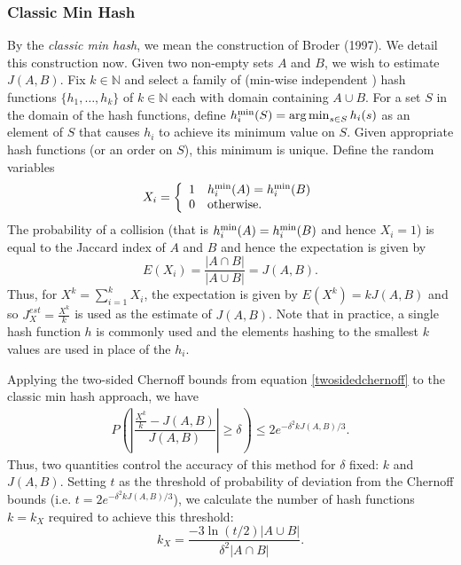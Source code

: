 \documentclass[11pt,reqno]{amsart}
\theoremstyle{remark}
\numberwithin{equation}{section}
\DeclareMathOperator*{\argmin}{arg\,min}
\newcommand{\classicX}{X}
\begin{document}
\subsubsection{Classic Min Hash}
By the \textit{classic min hash}, we mean the construction of Broder (1997). We detail this construction now. Given two non-empty sets $A$ and $B$, we wish to estimate $J(A,B)$. Fix $k\in \mathbb{N}$ and select a family of (min-wise independent \cite{broder2000min}) hash functions $\{h_1,\dots, h_k\}$ of $k\in \mathbb{N}$ each with domain containing $A\cup B$. For a set $S$ in the domain of the hash functions, define $h^{\rm min}_i(S)=\argmin_{s\in S} h_i(s)$ as an element of $S$ that causes $h_i$ to achieve its minimum value on $S$. Given appropriate hash functions (or an order on $S$), this minimum is unique. Define the random variables
$$\classicX_i=\left\{
\begin{array}{lll}
1 &h_i^{\rm min}(A)=h_i^{\rm min}(B)\\
0& {\rm otherwise}.
\end{array}
\right.$$
The probability of a collision (that is $h_i^{\rm min}(A)=h_i^{\rm min}(B)$ and hence $\classicX_i=1$) is equal to the Jaccard index of $A$ and $B$ \cite{broder2000min} and hence the expectation is given by
$$E(\classicX_i)= \dfrac{|A\cap B|}{|A\cup B|}=J(A,B).$$
Thus, for 
$\classicX^k=\sum\limits_{i=1}^k \classicX_i$,
the expectation is given by $E(\classicX^k)=k J(A,B)$ and so $J^{est}_X = \frac{\classicX^k}{k}$ is used as the estimate of $J(A,B)$. Note that in practice, a single hash function $h$ is commonly used and the elements hashing to the smallest $k$ values are used in place of the $h_i$.

Applying the two-sided Chernoff bounds from equation \eqref{twosidedchernoff} to the classic min hash approach, we have
\begin{align}
\label{eqn:ClassicChernoff}
P\left( \left|\dfrac{\frac{X^k}{k}-J(A,B)}{J(A,B)}\right|\geq\delta\right)\leq 2e^{-\delta^2kJ(A,B)/3}.
\end{align}
Thus, two quantities control the accuracy of this method for $\delta$ fixed: $k$ and $J(A,B)$. Setting $t$ as the threshold of probability of deviation from the Chernoff bounds (i.e. $t=2e^{-\delta^2k J(A,B)/3}$), we calculate the number of hash functions $k=k_\classicX$ required to achieve this threshold:
\begin{equation}
\label{eqn:Jaccardhashes}
k_\classicX=\dfrac{-3\ln(t/2)|A\cup B|}{\delta^2 |A\cap B|}.
\end{equation}
\end{document}
